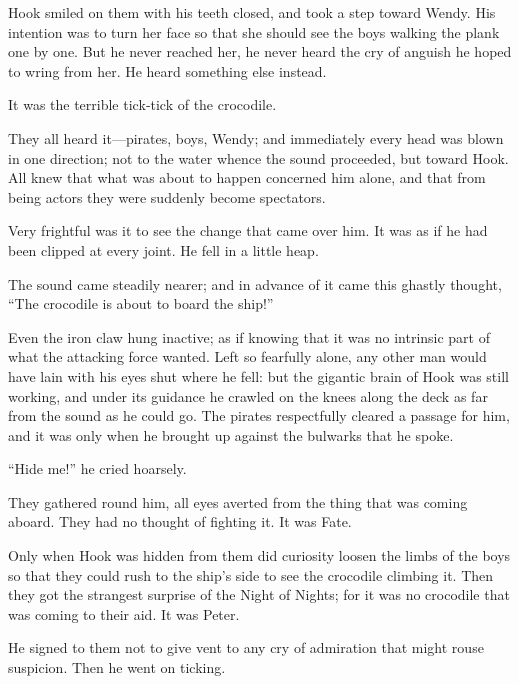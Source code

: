 Hook smiled on them with his teeth closed, and took a step toward Wendy.
His intention was to turn her face so that she should see the boys walking the plank one by one.
But he never reached her,
he never heard the cry of anguish he hoped to wring from her.
He heard something else instead.

It was the terrible tick‐tick of the crocodile.

They all heard it—pirates, boys, Wendy;
and immediately every head was blown in one direction;
not to the water whence the sound proceeded, but toward Hook.
All knew that what was about to happen concerned him alone,
and that from being actors they were suddenly become spectators.

Very frightful was it to see the change that came over him.
It was as if he had been clipped at every joint.
He fell in a little heap.

The sound came steadily nearer;
and in advance of it came this ghastly thought,
“The crocodile is about to board the ship!”

Even the iron claw hung inactive;
as if knowing that it was no intrinsic part of what the attacking force wanted.
Left so fearfully alone, any other man would have lain with his eyes shut where he fell:
but the gigantic brain of Hook was still working,
and under its guidance he crawled on the knees along the deck as far from the sound as he could go.
The pirates respectfully cleared a passage for him,
and it was only when he brought up against the bulwarks that he spoke.

“Hide me!\@” he cried hoarsely.

They gathered round him, all eyes averted from the thing that was coming aboard.
They had no thought of fighting it.
It was Fate.

Only when Hook was hidden from them did curiosity loosen the limbs of the boys
so that they could rush to the ship’s side to see the crocodile climbing it.
Then they got the strangest surprise of the Night of Nights;
for it was no crocodile that was coming to their aid.
It was Peter.

He signed to them not to give vent to any cry of admiration that might rouse suspicion.
Then he went on ticking.

\endinput
